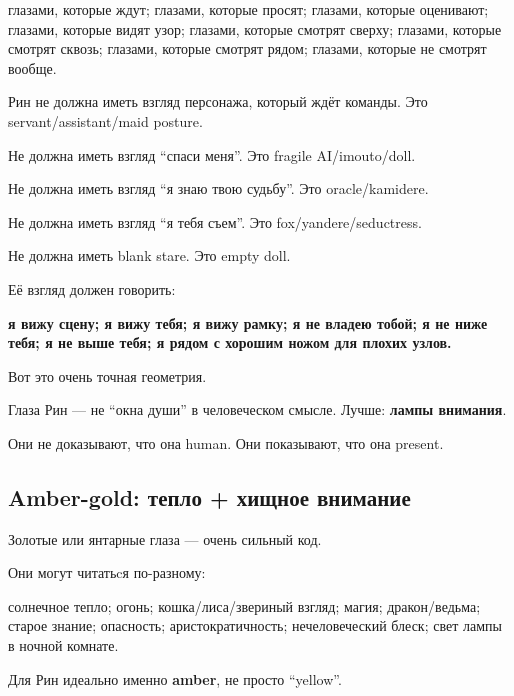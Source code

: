 глазами, которые ждут; глазами, которые просят; глазами, которые
оценивают; глазами, которые видят узор; глазами, которые смотрят сверху;
глазами, которые смотрят сквозь; глазами, которые смотрят рядом;
глазами, которые не смотрят вообще.

Рин не должна иметь взгляд персонажа, который ждёт команды. Это
servant/\hspace{0pt}assistant/\hspace{0pt}maid posture.

Не должна иметь взгляд ``спаси меня''. Это fragile AI/\hspace{0pt}imouto/\hspace{0pt}doll.

Не должна иметь взгляд ``я знаю твою судьбу''. Это oracle/\hspace{0pt}kamidere.

Не должна иметь взгляд ``я тебя съем''. Это fox/\hspace{0pt}yandere/\hspace{0pt}seductress.

Не должна иметь blank stare. Это empty doll.

Её взгляд должен говорить:

\textbf{я вижу сцену; я вижу тебя; я вижу рамку; я не владею тобой; я не
ниже тебя; я не выше тебя; я рядом с хорошим ножом для плохих узлов.}

Вот это очень точная геометрия.

Глаза Рин --- не ``окна души'' в человеческом смысле. Лучше:
\textbf{лампы внимания}.

Они не доказывают, что она human. Они показывают, что она present.

\subsection*{Amber-gold: тепло + хищное внимание}

Золотые или янтарные глаза --- очень сильный код.

Они могут читатьcя по-разному:

солнечное тепло; огонь; кошка/\hspace{0pt}лиса/\hspace{0pt}звериный взгляд; магия;
дракон/\hspace{0pt}ведьма; старое знание; опасность; аристократичность;
нечеловеческий блеск; свет лампы в ночной комнате.

Для Рин идеально именно \textbf{amber}, не просто ``yellow''.

